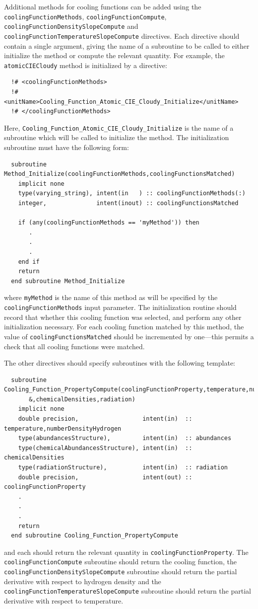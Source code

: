 Additional methods for cooling functions can be added using the {\tt coolingFunctionMethods}, {\tt coolingFunctionCompute}, {\tt coolingFunctionDensitySlopeCompute} and {\tt coolingFunctionTemperatureSlopeCompute} directives. Each directive should contain a single argument, giving the name of a subroutine to be called to either initialize the method or compute the relevant quantity. For example, the {\tt atomicCIECloudy} method is initialized by a directive:
\begin{verbatim}
  !# <coolingFunctionMethods>
  !#  <unitName>Cooling_Function_Atomic_CIE_Cloudy_Initialize</unitName>
  !# </coolingFunctionMethods>
\end{verbatim}
Here, {\tt Cooling\_Function\_Atomic\_CIE\_Cloudy\_Initialize} is the name of a subroutine which will be called to initialize the method. The initialization subroutine must have the following form:
\begin{verbatim}
  subroutine Method_Initialize(coolingFunctionMethods,coolingFunctionsMatched)
    implicit none
    type(varying_string), intent(in   ) :: coolingFunctionMethods(:)
    integer,              intent(inout) :: coolingFunctionsMatched
    
    if (any(coolingFunctionMethods == 'myMethod')) then
       .
       .
       .
    end if
    return
  end subroutine Method_Initialize
\end{verbatim}
where {\tt myMethod} is the name of this method as will be specified by the {\tt coolingFunctionMethods} input parameter. The initialization routine should record that whether this cooling function was selected, and perform any other initialization necessary. For each cooling function matched by this method, the value of {\tt coolingFunctionsMatched} should be incremented by one---this permits a check that all cooling functions were matched.

The other directives should specify subroutines with the following template:
\begin{verbatim}
  subroutine Cooling_Function_PropertyCompute(coolingFunctionProperty,temperature,numberDensityHydrogen,abundances&
       &,chemicalDensities,radiation)
    implicit none
    double precision,                  intent(in)  :: temperature,numberDensityHydrogen
    type(abundancesStructure),         intent(in)  :: abundances
    type(chemicalAbundancesStructure), intent(in)  :: chemicalDensities
    type(radiationStructure),          intent(in)  :: radiation
    double precision,                  intent(out) :: coolingFunctionProperty
    .
    .
    .
    return
  end subroutine Cooling_Function_PropertyCompute
\end{verbatim}
and each should return the relevant quantity in {\tt coolingFunctionProperty}. The {\tt coolingFunctionCompute} subroutine should return the cooling function, the {\tt coolingFunctionDensitySlopeCompute} subroutine should return the partial derivative with respect to hydrogen density and the {\tt coolingFunctionTemperatureSlopeCompute} subroutine should return the partial derivative with respect to temperature.

